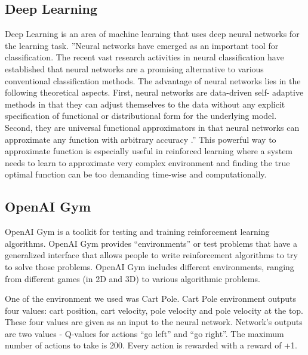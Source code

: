 \subsection{Deep Learning}
Deep Learning is an area of machine learning that uses deep neural networks for the learning task. ”Neural networks have emerged as an important tool for classification. The recent vast research activities in neural classification have established that neural networks are a promising alternative to various conventional classification methods. The advantage of neural networks lies in the following theoretical aspects. First, neural networks are data-driven self- adaptive methods in that they can adjust themselves to the data without any explicit specification of functional or distributional form for the underlying model. Second, they are universal functional approximators in that neural networks can approximate any function with arbitrary accuracy \cite{zhang2000neural}.” This powerful way to approximate function is especially useful in reinforced learning where a system needs to learn to approximate very complex environment and finding the true optimal function can be too demanding time-wise and computationally.

\subsection{OpenAI Gym}
OpenAI Gym is a toolkit for testing and training reinforcement learning algorithms. OpenAI Gym provides “environments” or test problems that have a generalized interface that allows people to write reinforcement algorithms to try to solve those problems. OpenAI Gym includes different environments, ranging from different games (in 2D and 3D) to various algorithmic problems.

One of the environment we used was Cart Pole. Cart Pole environment outputs four values: cart position, cart velocity, pole velocity and pole velocity at the top. These four values are given as an input to the neural network. Network’s outputs are two values - Q-values for actions “go left” and “go right”. The maximum number of actions to take is 200. Every action is rewarded with a reward of +1.





